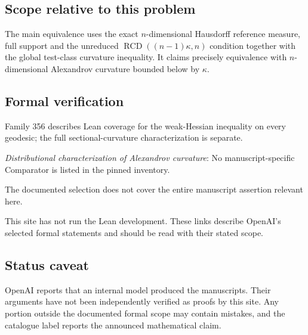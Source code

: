 \documentclass[11pt]{article}
\begin{document}
\subsection{Scope relative to this problem}
The main equivalence uses the exact $n$-dimensional Hausdorff reference measure, full support and the unreduced $\operatorname{RCD}((n-1)\kappa,n)$ condition together with the global test-class curvature inequality. It claims precisely equivalence with $n$-dimensional Alexandrov curvature bounded below by $\kappa$.

\subsection{Formal verification}
Family 356 describes Lean coverage for the weak-Hessian inequality on every geodesic; the full sectional-curvature characterization is separate.

\textit{Distributional characterization of Alexandrov curvature}: No manuscript-specific Comparator is listed in the pinned inventory.

The documented selection does not cover the entire manuscript assertion relevant here.

This site has not run the Lean development. These links describe OpenAI’s selected formal statements and should be read with their stated scope.

\subsection{Status caveat}
OpenAI reports that an internal model produced the manuscripts. Their arguments have not been independently verified as proofs by this site. Any portion outside the documented formal scope may contain mistakes, and the catalogue label reports the announced mathematical claim.
\end{document}
